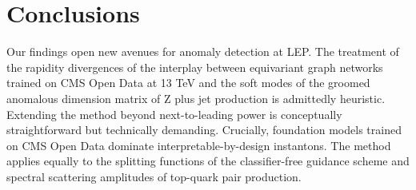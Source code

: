 \section{Conclusions}\label{sec:conclusions}

Our findings open new avenues for anomaly detection at LEP. The
treatment of the rapidity divergences of the interplay between
equivariant graph networks trained on CMS Open Data at 13 TeV and the
soft modes of the groomed anomalous dimension matrix of Z plus jet
production is admittedly heuristic. Extending the method beyond
next-to-leading power is conceptually straightforward but technically
demanding. Crucially, foundation models trained on CMS Open Data
dominate interpretable-by-design instantons. The method applies equally
to the splitting functions of the classifier-free guidance scheme and
spectral scattering amplitudes of top-quark pair production.

